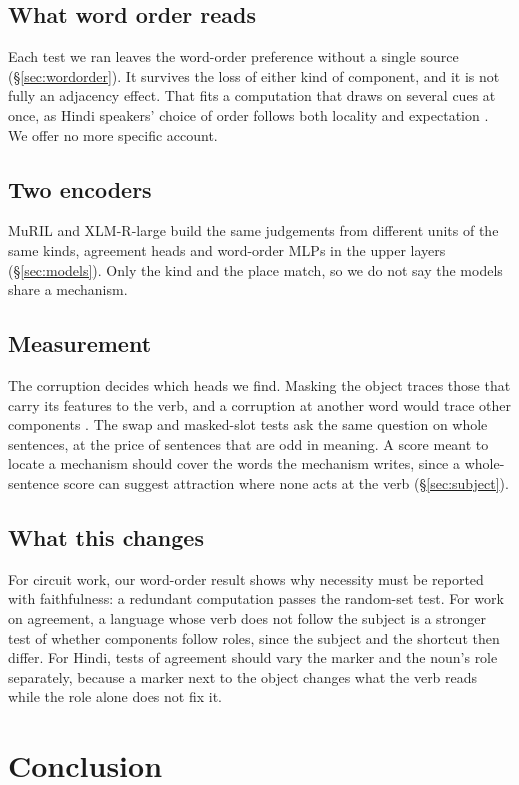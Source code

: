 \documentclass[11pt]{article}
\begin{document}
\subsection{What word order reads}
Each test we ran leaves the word-order preference without a single source (\S\ref{sec:wordorder}).
It survives the loss of either kind of component, and it is not fully an adjacency effect.
That fits a computation that draws on several cues at once, as Hindi speakers' choice of order follows both locality and expectation \citep{ranjan2022}.
We offer no more specific account.

\subsection{Two encoders}
MuRIL and XLM-R-large build the same judgements from different units of the same kinds, agreement heads and word-order MLPs in the upper layers (\S\ref{sec:models}).
Only the kind and the place match, so we do not say the models share a mechanism.

\subsection{Measurement}
The corruption decides which heads we find.
Masking the object traces those that carry its features to the verb, and a corruption at another word would trace other components \citep{zhang2024}.
The swap and masked-slot tests ask the same question on whole sentences, at the price of sentences that are odd in meaning.
A score meant to locate a mechanism should cover the words the mechanism writes, since a whole-sentence score can suggest attraction where none acts at the verb (\S\ref{sec:subject}).

\subsection{What this changes}
For circuit work, our word-order result shows why necessity must be reported with faithfulness: a redundant computation passes the random-set test.
For work on agreement, a language whose verb does not follow the subject is a stronger test of whether components follow roles, since the subject and the shortcut then differ.
For Hindi, tests of agreement should vary the marker and the noun's role separately, because a marker next to the object changes what the verb reads while the role alone does not fix it.

\section{Conclusion}
\label{sec:conclusion}
\end{document}
